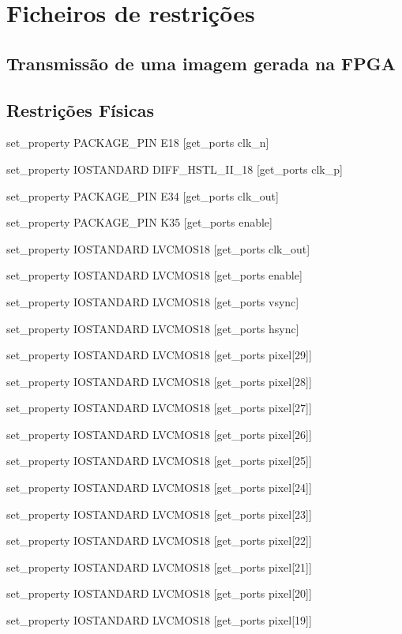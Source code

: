 {\tiny \chapter{Ficheiros de restrições} \label{ap2:codigo}}

\section{Transmissão de uma imagem gerada na FPGA} \label{ap2:planA}


\section{Restrições Físicas} \label{ap2:planA_physical_cnstrs}

set\_property PACKAGE\_PIN E18 [get\_ports clk\_n]

set\_property IOSTANDARD DIFF\_HSTL\_II\_18 [get\_ports clk\_p]

set\_property PACKAGE\_PIN E34 [get\_ports clk\_out]

set\_property PACKAGE\_PIN K35 [get\_ports enable]

set\_property IOSTANDARD LVCMOS18 [get\_ports clk\_out]

set\_property IOSTANDARD LVCMOS18 [get\_ports enable]

set\_property IOSTANDARD LVCMOS18 [get\_ports vsync]

set\_property IOSTANDARD LVCMOS18 [get\_ports hsync]

set\_property IOSTANDARD LVCMOS18 [get\_ports {pixel[29]}]

set\_property IOSTANDARD LVCMOS18 [get\_ports {pixel[28]}]

set\_property IOSTANDARD LVCMOS18 [get\_ports {pixel[27]}]

set\_property IOSTANDARD LVCMOS18 [get\_ports {pixel[26]}]

set\_property IOSTANDARD LVCMOS18 [get\_ports {pixel[25]}]

set\_property IOSTANDARD LVCMOS18 [get\_ports {pixel[24]}]

set\_property IOSTANDARD LVCMOS18 [get\_ports {pixel[23]}]

set\_property IOSTANDARD LVCMOS18 [get\_ports {pixel[22]}]

set\_property IOSTANDARD LVCMOS18 [get\_ports {pixel[21]}]

set\_property IOSTANDARD LVCMOS18 [get\_ports {pixel[20]}]

set\_property IOSTANDARD LVCMOS18 [get\_ports {pixel[19]}]

